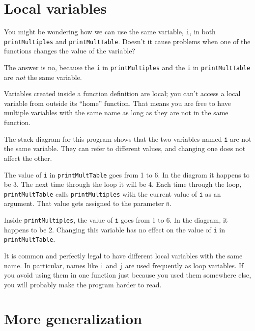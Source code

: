 \pagebreak

\section{Local variables}

You might be wondering how we can use the same variable, {\tt i}, in
both {\tt printMultiples} and {\tt printMultTable}.  Doesn't it cause
problems when one of the functions changes the value of the variable?

The answer is no, because the {\tt i} in {\tt printMultiples} and the
{\tt i} in {\tt printMultTable} are {\em not} the same variable.

Variables created inside a function definition are local; you can't
access a local variable from outside its ``home'' function.  That
means you are free to have multiple variables with the same name as
long as they are not in the same function.

The stack diagram for this program shows that the two
variables named {\tt i} are not the same variable.  They can refer to
different values, and changing one does not affect the other.

\beforefig
\centerline{}
\afterfig

The value of {\tt i} in {\tt printMultTable} goes from 1 to 6.  In the
diagram it happens to be 3.  The next time through the loop it will
be 4.  Each time through the loop, {\tt printMultTable} calls
{\tt printMultiples} with the current value of {\tt i} as an
argument.  That value gets assigned to the parameter {\tt n}.

Inside {\tt printMultiples}, the value of {\tt i} goes from
1 to 6.  In the diagram, it happens to be 2.  Changing this variable
has no effect on the value of {\tt i} in {\tt printMultTable}.

It is common and perfectly legal to have different local variables
with the same name.  In particular, names like {\tt i} and {\tt j} are
used frequently as loop variables.  If you avoid
using them in one function just because you used them somewhere else,
you will probably make the program harder to read.


\pagebreak

\section{More generalization}

